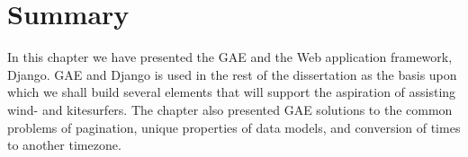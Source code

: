 

\section{Summary}
In this chapter we have presented the GAE and the Web application framework,
Django. GAE and Django is used in the rest of the dissertation as the basis upon
which we shall build several elements that will support the aspiration of assisting
wind- and kitesurfers. The chapter also presented GAE solutions to the common
problems of pagination, unique properties of data models, and conversion of times
to another timezone.
